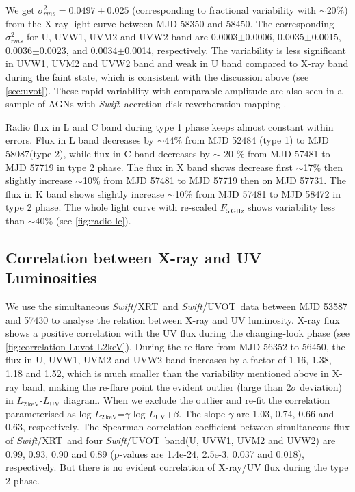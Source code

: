 \documentclass[twocolumn]{aastex63}
\newcommand{\swift}{{\small \it Swift}}
\newcommand{\xrt}{{\small {\it Swift}/XRT}}
\newcommand{\uvot}{{\small {\it Swift}/UVOT}}
\begin{document}
We get $\sigma^2_{rms} = 0.0497 \pm 0.025 $ (corresponding to fractional variability with $\sim$20\%) from the X-ray light curve between MJD 58350 and 58450. The corresponding $\sigma^2_{rms}$ for U, UVW1, UVM2 and UVW2 band are 0.0003$\pm$0.0006, 0.0035$\pm$0.0015, 0.0036$\pm$0.0023, and 0.0034$\pm$0.0014, respectively. The variability is less significant in UVW1, UVM2 and UVW2 band and weak in U band compared to X-ray band during the faint state, which is consistent with the discussion above (see \autoref{sec:uvot}). These rapid variability with comparable amplitude are also seen in a sample of AGNs with \swift \, accretion disk reverberation mapping \citep[see ][]{2019ApJ...870..123E}.

Radio flux in L and C band during type 1 phase keeps almost constant within errors. Flux in L band decreases by $\sim$44\% from MJD 52484 (type 1) to MJD 58087(type 2), while flux in C band decreases by $\sim$ 20 \% from MJD 57481 to MJD 57719 in type 2 phase. The flux in X band shows decrease first $\sim$17\% then slightly increase $\sim$10\% from MJD 57481 to MJD 57719 then on MJD 57731. The flux in K band shows slightly increase $\sim$10\% from MJD 57481 to MJD 58472 in type 2 phase. The whole light curve with re-scaled $F_\mathrm{5\,GHz}$ shows variability less than $\sim$40\% (see \autoref{fig:radio-lc}). 



\subsection{Correlation between X-ray and UV Luminosities}\label{subsec:xray-uv}
We use the simultaneous \xrt\, and \uvot\, data between MJD 53587 and 57430 to analyse the relation between X-ray and UV luminosity. X-ray flux shows a positive correlation with the UV flux during the changing-look phase (see \autoref{fig:correlation-Luvot-L2keV}). During the re-flare from MJD 56352 to 56450, the flux in U, UVW1, UVM2 and UVW2 band increases by a factor of 1.16, 1.38, 1.18 and 1.52, which is much smaller than the variability mentioned above in X-ray band, making the re-flare point the evident outlier (large than 2$\sigma$ deviation) in $L_\mathrm{{2\,keV}}$-$L_\mathrm{{UV}}$ diagram. When we exclude the outlier and re-fit the correlation parameterised as log $ L_\mathrm{{2\,keV}}$=$\gamma$ log $ L_\mathrm{{UV}}$+$\beta$. The slope $\gamma$ are 1.03, 0.74, 0.66 and 0.63, respectively. The Spearman correlation coefficient between simultaneous flux of \xrt\, and four \uvot\, band(U, UVW1, UVM2 and UVW2) are 0.99, 0.93, 0.90 and 0.89 (p-values are 1.4e-24, 2.5e-3, 0.037 and 0.018), respectively. But there is no evident correlation of X-ray/UV flux during the type 2 phase.
\end{document}
